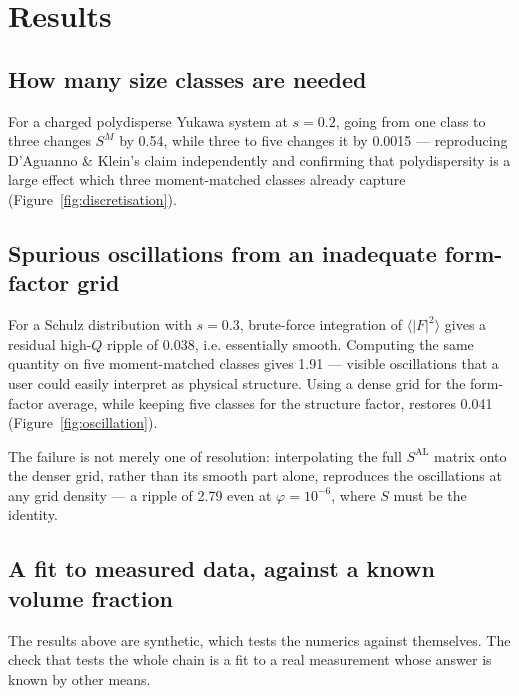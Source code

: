 \documentclass[11pt,a4paper]{article}
\newcommand{\Q}{Q}
\begin{document}
\section{Results}

\subsection{How many size classes are needed}

For a charged polydisperse Yukawa system at $s=0.2$, going from one class to
three changes $S^{M}$ by 0.54, while three to five changes it by 0.0015 ---
reproducing D'Aguanno \& Klein's claim \citep{DAguannoKlein1992} independently and confirming that
polydispersity is a large effect which three moment-matched classes already
capture (Figure~\ref{fig:discretisation}).



\subsection{Spurious oscillations from an inadequate form-factor grid}
\label{sec:oscillation}

For a Schulz distribution with $s=0.3$, brute-force integration of
$\langle|F|^2\rangle$ gives a residual high-$\Q$ ripple of 0.038, i.e.
essentially smooth. Computing the same quantity on five moment-matched classes
gives 1.91 --- visible oscillations that a user could easily interpret as
physical structure. Using a dense grid for the form-factor average, while
keeping five classes for the structure factor, restores 0.041
(Figure~\ref{fig:oscillation}).

The failure is not merely one of resolution: interpolating the full
$S^{\mathrm{AL}}$ matrix onto the denser grid, rather than its smooth part
alone, reproduces the oscillations at any grid density --- a ripple of 2.79
even at $\varphi = 10^{-6}$, where $S$ must be the identity.

\subsection{A fit to measured data, against a known volume fraction}
\label{sec:realfit}

The results above are synthetic, which tests the numerics against
themselves. The check that tests the whole chain is a fit to a real
measurement whose answer is known by other means.
\end{document}
